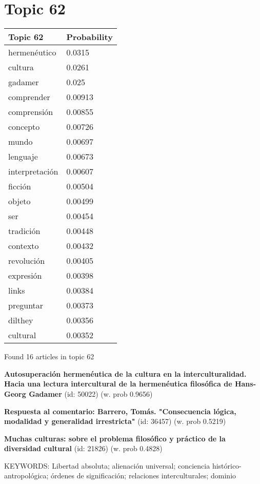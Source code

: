 \documentclass{article}
\begin{document}
\section*{Topic 62}\vfill
\begin{tabular}{ll}
\toprule
       Topic 62 & Probability \\
\midrule
   hermenéutico &      0.0315 \\
        cultura &      0.0261 \\
        gadamer &       0.025 \\
     comprender &     0.00913 \\
    comprensión &     0.00855 \\
       concepto &     0.00726 \\
          mundo &     0.00697 \\
       lenguaje &     0.00673 \\
 interpretación &     0.00607 \\
        ficción &     0.00504 \\
         objeto &     0.00499 \\
            ser &     0.00454 \\
      tradición &     0.00448 \\
       contexto &     0.00432 \\
     revolución &     0.00405 \\
      expresión &     0.00398 \\
          links &     0.00384 \\
      preguntar &     0.00373 \\
        dilthey &     0.00356 \\
       cultural &     0.00352 \\
\bottomrule
\end{tabular}

\vfill
Found 16 articles in topic 62
\vfill

\textbf{Autosuperación hermenéutica de la cultura en la interculturalidad. Hacia una lectura intercultural de la hermenéutica filosófica de Hans-Georg Gadamer} (id: 50022)
 (w. prob 0.9656)
\vfill

\textbf{Respuesta al comentario: Barrero, Tomás. "Consecuencia lógica, modalidad y generalidad irrestricta"} (id: 36457)
 (w. prob 0.5219)
\vfill

\textbf{Muchas culturas: sobre el problema filosófico y práctico de la diversidad cultural} (id: 21826)
 (w. prob 0.4828)


KEYWORDS:
Libertad absoluta; alienación universal; conciencia histórico-antropológica; órdenes de significación; relaciones interculturales; dominio
\end{document}

